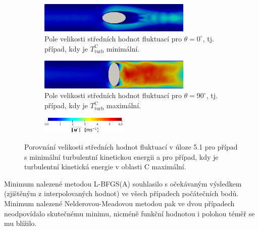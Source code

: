\begin{figure}[H]
	\begin{subfigure}[b]{1.0\textwidth}
		\begin{center}
			\centering
			\includegraphics[width=0.8\textwidth, trim={0mm 0mm 0mm 0mm}]{Images/ellipse1_min_aaa.png}
			\vspace{2mm}
			\caption{Pole velikosti středních hodnot fluktuací pro $ \theta = 0^{\circ}$, tj. případ, kdy je $T^{\text{C}}_{\text{turb}} $ minimální.}
			\label{fig:elip1_0}
		\end{center}
		\vspace{2.8mm}
	\end{subfigure}
	\begin{subfigure}[b]{1.0\textwidth}
			\centering
			\includegraphics[width=0.8\textwidth, trim={0 0mm 0 0mm}]{Images/ellipse1_max_a.png}
			\vspace{1.8mm}
			\caption{Pole velikosti středních hodnot fluktuací pro $ \theta = 90^{\circ}$, tj. případ, kdy je $ T^{\text{C}}_{\text{turb}} $ maximální.}
			\label{fig:elip1_90}
	\end{subfigure}
	\begin{subfigure}[b]{1.0\textwidth}
		\centering
		\vspace{2.5mm}
		\includegraphics[width=0.45\textwidth, trim={0 0mm 0 0mm}]{Images/ellipse12_legenda.png}
	\end{subfigure}
	\caption{Porovnání velikosti středních hodnot fluktuací v úloze 5.1 pro případ s minimální turbulentní kinetickou energii a pro případ, kdy je turbulentní kinetická energie v oblasti C maximální.}
	\label{fig:1}
\end{figure}

Minimum nalezené metodou L-BFGS(A) souhlasilo s očekávaným výsledkem (zjištěným z interpolovaných hodnot) ve všech případech počátečních bodů. Minimum nalezené Nelderovou-Meadovou metodou pak ve dvou případech neodpovídalo skutečnému minimu, nicméně funkční hodnotou i polohou téměř se mu blížilo.

